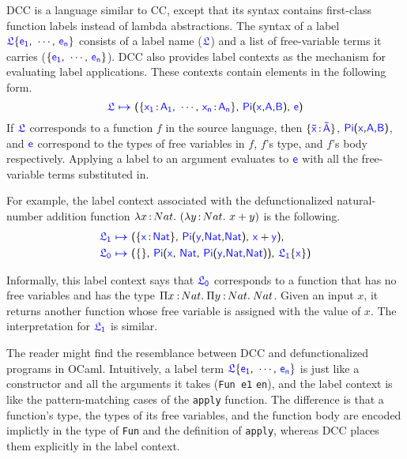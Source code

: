 DCC is a language similar to CC, except that its syntax contains first-class function labels instead of lambda abstractions. The syntax of a label $\target{\flabel}\{\target{e_1} \sfcomma \cdots \sfcomma \target{e_n}\}$ consists of a label name ($\target{\flabel}$) and a list of free-variable terms it carries ($\{\target{e_1} \sfcomma \cdots \sfcomma \target{e_n}\}$). DCC also provides label contexts as the mechanism for evaluating label applications. These contexts contain elements in the following form.
\begin{equation*}
	\itemdef{\target{\flabel}}{\itemtype{x_1}{A_1} \sfcomma \cdots \sfcomma \itemtype{x_n}{A_n}}{\targetpi{x}{A}{B}}{\target{e}}
\end{equation*}
If $\target{\flabel}$ corresponds to a function $f$ in the source language, then $\{\itemtype{\bar{x}}{\bar{A}}\}$, $\targetpi{x}{A}{B}$, and $\target{e}$ correspond to the types of free variables in $f$, $f$'s type, and $f$'s body respectively. Applying a label to an argument evaluates to $\target{e}$ with all the free-variable terms substituted in.

For example, the label context associated with the defunctionalized natural-number addition function 
$\lambda x\hspace{0.5mm}{:}\hspace{0.5mm} Nat.\ (\lambda y\hspace{0.5mm}{:}\hspace{0.5mm} Nat.\ x + y)$ is the following.
\begin{align*}
	&\itemdef{\target{\flabel_1}}{\itemtype{\target{x}}{Nat}}{\targetpi{y}{Nat}{Nat}}{\target{x} + \target{y}}\sfcomma\\
	& \itemdef{\target{\flabel_0}}{}
	{\target{Pi}\textsf{(}\target{x}\sfcomma \target{Nat}\sfcomma \targetpi{y}{Nat}{Nat}\textsf{)}}
	{\targetlab{\flabel_1}{x}}
\end{align*}

Informally, this label context says that $\target{\flabel_0}$ corresponds to a function that has no free variables and has the type $\Pi x\mkern1.5mu{\hspace{0.5mm}{:}\hspace{0.5mm}} Nat.\hspace{0.8mm}\Pi y\mkern1.5mu{\hspace{0.5mm}{:}\hspace{0.5mm}} Nat.\hspace{0.8mm}Nat$. Given an input $x$, it returns another function whose free variable is assigned with the value of $x$. The interpretation for $\target{\flabel_1}$ is similar.

The reader might find the resemblance between DCC and defunctionalized programs in OCaml. Intuitively, a label term $\target{\flabel}\{\target{e_1} \sfcomma \cdots \sfcomma \target{e_n}\}$ is just like a constructor and all the arguments it takes (\texttt{Fun e1} \codemath{\cdots} \texttt{en}), and the label context is like the pattern-matching cases of the \texttt{apply} function. The difference is that a function's type, the types of its free variables, and the function body are encoded implictly in the type of \texttt{Fun} and the definition of \texttt{apply}, whereas DCC places them explicitly in the label context. 




